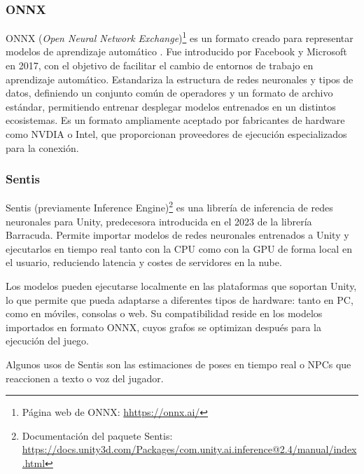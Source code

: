 \subsubsection{ONNX}
ONNX (\textit{Open Neural Network Exchange})\footnote{Página web de ONNX: \url{hhttps://onnx.ai/}} es un formato creado para representar modelos de aprendizaje automático . Fue introducido por Facebook y Microsoft en 2017, con el objetivo de facilitar el cambio de entornos de trabajo en aprendizaje automático. Estandariza la estructura de redes neuronales y tipos de datos, definiendo un conjunto común de operadores y un formato de archivo estándar, permitiendo entrenar desplegar modelos entrenados en un distintos ecosistemas. Es un formato ampliamente aceptado por fabricantes de hardware como NVDIA o Intel, que proporcionan proveedores de ejecución especializados para la conexión.

\subsubsection{Sentis}
Sentis (previamente Inference Engine)\footnote{Documentación del paquete Sentis: \url{https://docs.unity3d.com/Packages/com.unity.ai.inference@2.4/manual/index.html}} es una librería de inferencia de redes neuronales para Unity, predecesora introducida en el 2023 de la librería Barracuda. Permite importar modelos de redes neuronales entrenados a Unity y ejecutarlos en tiempo real tanto con la CPU como con la GPU  de forma local en el usuario, reduciendo latencia y costes de servidores en la nube. \newline

Los modelos pueden ejecutarse localmente en las plataformas que soportan Unity, lo que permite que pueda adaptarse a diferentes tipos de hardware: tanto en PC, como en móviles, consolas o web. Su compatibilidad reside en los modelos importados en formato ONNX, cuyos grafos se optimizan después para la ejecución del juego. \newline

Algunos usos de Sentis son las estimaciones de poses en tiempo real o NPCs que reaccionen a texto o voz del jugador.